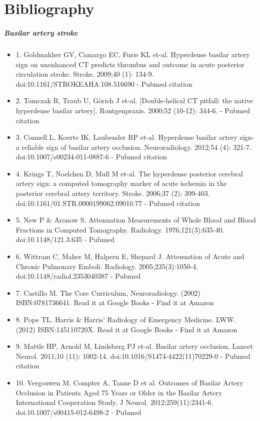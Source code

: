 \chapter{Bibliography}
\paragraph{Basilar artery stroke}
{\tiny 
	\begin{itemize}
		\tightlist
		\item
		1. Goldmakher GV, Camargo EC, Furie KL et-al. Hyperdense basilar artery sign on unenhanced CT predicts thrombus and outcome in acute posterior circulation stroke. Stroke. 2009;40 (1): 134-9. doi:10.1161/STROKEAHA.108.516690 - Pubmed citation
		\item
		2. Tomczak R, Traub U, Görich J et-al. {[}Double-helical CT pitfall: the native hyperdense basilar artery{]}. Rontgenpraxis. 2000;52 (10-12): 344-6. - Pubmed citation
		\item
		3. Connell L, Koerte IK, Laubender RP et-al. Hyperdense basilar artery sign-a reliable sign of basilar artery occlusion. Neuroradiology. 2012;54 (4): 321-7. doi:10.1007/s00234-011-0887-6 - Pubmed citation
		\item
		4. Krings T, Noelchen D, Mull M et-al. The hyperdense posterior cerebral artery sign: a computed tomography marker of acute ischemia in the posterior cerebral artery territory. Stroke. 2006;37 (2): 399-403. doi:10.1161/01.STR.0000199062.09010.77 - Pubmed citation
		\item
		5. New P \& Aronow S. Attenuation Measurements of Whole Blood and Blood Fractions in Computed Tomography. Radiology. 1976;121(3):635-40. doi:10.1148/121.3.635 - Pubmed
		\item
		6. Wittram C, Maher M, Halpern E, Shepard J. Attenuation of Acute and Chronic Pulmonary Emboli. Radiology. 2005;235(3):1050-4. doi:10.1148/radiol.2353040387 - Pubmed
		\item
		7. Castillo M. The Core Curriculum, Neuroradiology. (2002) ISBN:0781736641. Read it at Google Books - Find it at Amazon
		\item
		8. Pope TL. Harris \& Harris' Radiology of Emergency Medicine. LWW. (2012) ISBN:145110720X. Read it at Google Books - Find it at Amazon
		\item
		9. Mattle HP, Arnold M, Lindsberg PJ et-al. Basilar artery occlusion. Lancet Neurol. 2011;10 (11): 1002-14. doi:10.1016/S1474-4422(11)70229-0 - Pubmed citation{}
		\item
		10. Vergouwen M, Compter A, Tanne D et al. Outcomes of Basilar Artery Occlusion in Patients Aged 75 Years or Older in the Basilar Artery International Cooperation Study. J Neurol. 2012;259(11):2341-6. doi:10.1007/s00415-012-6498-2 - Pubmed

\end{itemize}}
